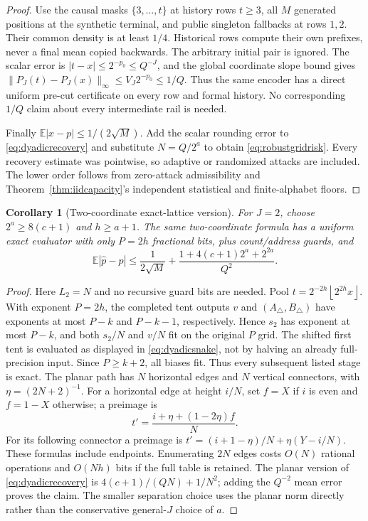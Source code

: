 \documentclass[11pt,letterpaper]{article}
\newtheorem{corollary}[theorem]{Corollary}
\theoremstyle{definition}\newtheorem{definition}[theorem]{Definition}
\theoremstyle{remark}\newtheorem{remark}[theorem]{Remark}
\newcommand{\E}{\mathbb{E}}
\newcommand{\floor}[1]{\left\lfloor #1\right\rfloor}
\begin{document}
\begin{proof}
Use the causal masks $\{3,\ldots,t\}$ at history rows $t\ge3$, all $M$ generated positions at the synthetic terminal, and public singleton fallbacks at rows $1,2$. Their common density is at least $1/4$. Historical rows compute their own prefixes, never a final mean copied backwards. The arbitrary initial pair is ignored. The scalar error is $|t-x|\le2^{-p_0}\le Q^{-J}$, and the global coordinate slope bound gives
$\|P_J(t)-P_J(x)\|_\infty\le V_J2^{-p_0}\le1/Q$.
Thus the same encoder has a direct uniform pre-cut certificate on every row and formal history. No corresponding $1/Q$ claim about every intermediate rail is needed.

Finally $\E|x-p|\le1/(2\sqrt M)$. Add the scalar rounding error to \eqref{eq:dyadicrecovery} and substitute $N=Q/2^a$ to obtain \eqref{eq:robustgridrisk}. Every recovery estimate was pointwise, so adaptive or randomized attacks are included. The lower order follows from zero-attack admissibility and Theorem~\ref{thm:iidcapacity}'s independent statistical and finite-alphabet floors.
\end{proof}

\begin{corollary}[Two-coordinate exact-lattice version]\label{cor:robusttwo}
For $J=2$, choose $2^a\ge8(c+1)$ and $h\ge a+1$. The same two-coordinate formula has a uniform exact evaluator with only $P=2h$ fractional bits, plus count/address guards, and
\[
 \E|\widehat p-p|\le\frac1{2\sqrt M}
       +\frac{1+4(c+1)2^a+2^{2a}}{Q^2}.
\]
\end{corollary}
\begin{proof}
Here $L_2=N$ and no recursive guard bits are needed. Pool $t=2^{-2h}\floor{2^{2h}x}$. With exponent $P=2h$, the completed tent outputs $v$ and $(A_\triangle,B_\triangle)$ have exponents at most $P-k$ and $P-k-1$, respectively. Hence $s_2$ has exponent at most $P-k$, and both $s_2/N$ and $v/N$ fit on the original $P$ grid. The shifted first tent is evaluated as displayed in \eqref{eq:dyadicsnake}, not by halving an already full-precision input. Since $P\ge k+2$, all biases fit. Thus every subsequent listed stage is exact. The planar path has $N$ horizontal edges and $N$ vertical connectors, with $\eta=(2N+2)^{-1}$. For a horizontal edge at height $i/N$, set $f=X$ if $i$ is even and $f=1-X$ otherwise; a preimage is
\[
 t'=\frac{i+\eta+(1-2\eta)f}{N}.
\]
For its following connector a preimage is
$t'=(i+1-\eta)/N+\eta(Y-i/N)$.
These formulas include endpoints. Enumerating $2N$ edges costs $O(N)$ rational operations and $O(Nh)$ bits if the full table is retained. The planar version of \eqref{eq:dyadicrecovery} is $4(c+1)/(QN)+1/N^2$; adding the $Q^{-2}$ mean error proves the claim. The smaller separation choice uses the planar norm directly rather than the conservative general-$J$ choice of $a$.
\end{proof}
\end{document}
